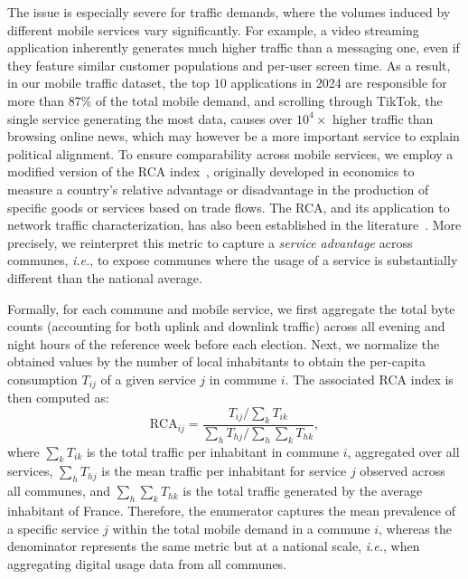 \documentclass[9pt,sigconf,letterpaper]{acmart}
\newcommand{\ie}{\textit{i.e.},\xspace}
\begin{document}
The issue is especially severe for traffic demands, where the volumes induced by different mobile services vary significantly.
For example, a video streaming application inherently generates much higher traffic than a messaging one, even if they feature similar customer populations and per-user screen time.
As a result, in our mobile traffic dataset, the top $10$ applications in 2024 are responsible for more than $87\%$ of the total mobile demand, and scrolling through TikTok, the single service generating the most data, causes over $10^4\times$ higher traffic than browsing online news, which may however be a more important service to explain political alignment.
To ensure comparability across mobile services, we employ a modified version of the \ac{RCA} index~\cite{rca}, originally developed in economics to measure a country’s relative advantage or disadvantage in the production of specific goods or services based on trade flows. 
The \ac{RCA}, and its application to network traffic characterization, has also been established in the literature~\cite{mishra2022digitaldivide,ucar21news,goel2025predicting}.
More precisely, we reinterpret this metric to capture a \textit{service advantage} across communes, \ie to expose communes where the usage of a service is substantially different than the national average.

Formally, for each commune and mobile service, we first aggregate the total byte counts (accounting for both uplink and downlink traffic) across all evening and night hours of the reference week before each election. Next, we normalize the obtained values by the number of local inhabitants to obtain the per-capita consumption $T_{ij}$ of a given service $j$ in commune $i$.
The associated \ac{RCA} index is then computed as:
\begin{equation}
\text{RCA}_{ij} = \frac{T_{ij} / \sum_k T_{ik}}{\sum_h T_{hj} / \sum_h \sum_k T_{hk}},
\label{eq:rca_traffic}
\end{equation}
where 
$\sum_k T_{ik}$ is the total traffic per inhabitant in commune $i$, aggregated over all services,
$\sum_h T_{hj}$ is the mean traffic per inhabitant for service $j$ observed across all communes,
and $\sum_h \sum_k T_{hk}$ is the total traffic generated by the average inhabitant of France.
Therefore, the enumerator captures the mean prevalence of a specific service $j$ within the total mobile demand in a commune $i$, whereas the denominator represents the same metric but at a national scale, \ie when aggregating digital usage data from all communes.
\end{document}
